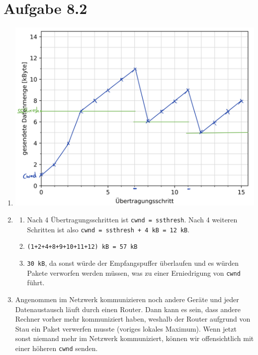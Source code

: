 \documentclass[12pt, a4paper]{article}
\begin{document}
\section*{Aufgabe 8.2}
\begin{enumerate}[label=\alph*)]
	\item	\includegraphics[scale=0.45]{8.2_a).png}
	\item	\begin{enumerate}[label=\roman*)]
				\item	Nach 4 Übertragungsschritten ist \verb|cwnd = ssthresh|. Nach 4 weiteren Schritten ist also \verb|cwnd = ssthresh + 4 kB = 12 kB|.
				\item	\verb|(1+2+4+8+9+10+11+12) kB = 57 kB|
				\item	\verb|30 kB|, da sonst würde der Empfangspuffer überlaufen und es würden Pakete verworfen werden müssen, was zu einer Erniedrigung von \verb|cwnd| führt.
			\end{enumerate}
	\item	Angenommen im Netzwerk kommunizieren noch andere Geräte und jeder Datenaustausch läuft durch einen Router. Dann kann es sein, dass andere Rechner vorher mehr kommuniziert haben, weshalb der Router aufgrund von Stau ein Paket verwerfen musste (voriges lokales Maximum). Wenn jetzt sonst niemand mehr im Netzwerk kommuniziert, können wir offensichtlich mit einer höheren \verb|cwnd| senden.
\end{enumerate}


\newpage
\end{document}
